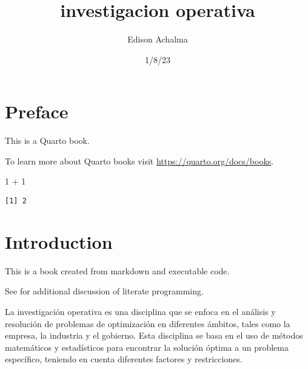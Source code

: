 \documentclass[
  letterpaper,
  DIV=11,
  numbers=noendperiod]{scrreprt}
\title{investigacion operativa}
\author{Edison Achalma}
\date{1/8/23}
\newenvironment{Shaded}{}{}
\newcommand{\DecValTok}[1]{\textcolor[rgb]{0.00,0.36,0.77}{#1}}
\newcommand{\SpecialCharTok}[1]{\textcolor[rgb]{0.00,0.36,0.77}{#1}}
\renewcommand*\contentsname{Tabla de contenidos}
\newcommand\contentsname{Tabla de contenidos}
\theoremstyle{definition}
\theoremstyle{definition}
\theoremstyle{remark}
\begin{document}
\maketitle
\ifdefined\Shaded\renewenvironment{Shaded}{\begin{tcolorbox}[boxrule=0pt, borderline west={3pt}{0pt}{shadecolor}, frame hidden, enhanced, sharp corners, interior hidden, breakable]}{\end{tcolorbox}}\fi

\renewcommand*\contentsname{Tabla de contenidos}
{
\hypersetup{linkcolor=}
\setcounter{tocdepth}{2}
\tableofcontents
}

\hypertarget{preface}{%
\chapter*{Preface}\label{preface}}


This is a Quarto book.

To learn more about Quarto books visit
\url{https://quarto.org/docs/books}.

\begin{Shaded}
\begin{Highlighting}[]
\DecValTok{1} \SpecialCharTok{+} \DecValTok{1}
\end{Highlighting}
\end{Shaded}

\begin{verbatim}
[1] 2
\end{verbatim}


\hypertarget{introduction}{%
\chapter*{Introduction}\label{introduction}}


This is a book created from markdown and executable code.

See \textcite{knuth84} for additional discussion of literate
programming.

La investigación operativa es una disciplina que se enfoca en el
análisis y resolución de problemas de optimización en diferentes
ámbitos, tales como la empresa, la industria y el gobierno. Esta
disciplina se basa en el uso de métodos matemáticos y estadísticos para
encontrar la solución óptima a un problema específico, teniendo en
cuenta diferentes factores y restricciones.
\end{document}
